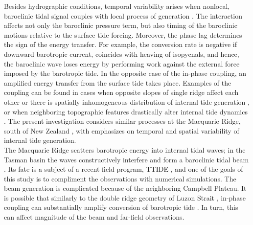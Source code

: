 \documentclass[12pt]{article}
\begin{document}
Besides hydrographic conditions, temporal variability arises when nonlocal, baroclinic tidal signal 
couples  
with local process of generation \citep{Kelly2010a, zilberman2011incoherent, 
pickering2015structure}. The interaction affects not only the baroclinic pressure term, but also 
timing 
of the baroclinic motions relative to the surface tide forcing. Moreover, the phase lag determines 
the sign of the energy transfer. For example, the conversion rate is negative if downward 
barotropic current, coincides with heaving of isopycnals, and hence, the baroclinic wave loses 
energy by performing work against the external force imposed by the barotropic tide. In the 
opposite case of the in-phase coupling, an amplified energy transfer from the surface tide takes 
place. Examples of the coupling can be found in cases when opposite slopes of single ridge 
affect each other \citep{zilberman2011incoherent, echeverri2010internal} or there is spatially 
inhomogeneous distribution of internal tide generation \citep{osborne2011spatial, 
ponte2013coastal}, or when neighboring topographic features drastically alter internal tide 
dynamics \citep{xing1998three, buijsman2012modeling, klymak2013parameterizing, buijsman2014three}. 
The present investigation considers similar processes at the Macquarie Ridge, south of New Zealand 
, with emphasizes on temporal and spatial variability of internal 
tide generation.\\

The Macquarie Ridge scatters barotropic energy into internal tidal waves; in the Tasman basin the 
waves constructively interfere \citep{rainville2010interference} and form a baroclinic tidal beam 
\citep{zhao2016global}. Its 
fate is a subject of a recent field program, TTIDE \citep{pinkel2015breaking}, and one of the goals 
of this study is to compliment the observations with numerical simulations. The beam generation is 
complicated because of the neighboring Campbell Plateau. It is possible that similarly to the 
double ridge geometry of Luzon Strait \citep{alford2011energy}, in-phase coupling can substantially 
amplify 
conversion of barotropic tide \citep{buijsman2012double, echeverri2010internal}. In turn, 
this can affect magnitude of the beam and far-field observations.\\
\end{document}
